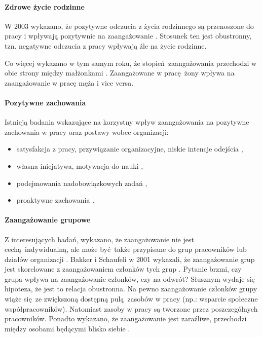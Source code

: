 \paragraph{Zdrowe życie rodzinne}
W 2003 wykazano, że pozytywne odczucia z życia rodzinnego są przenoszone do pracy i wpływają pozytywnie na zaangażowanie \citep{montgomery2003work}. Stosunek ten jest obustronny, tzn. negatywne odczucia z pracy wpływają źle na życie rodzinne. 

Co więcej wykazano w tym samym roku, że stopień zaangażowania przechodzi w obie strony między małżonkami \citep{bakker2003crossover}. Zaangażowane w pracę żony wpływa na zaangażowanie w pracę męża i vice versa.
\paragraph{Pozytywne zachowania}
Istnieją badania wskazujące na korzystny wpływ zaangażowania na pozytywne zachowania w pracy oraz postawy wobec organizacji:
\begin{itemize}
  \item satysfakcja z pracy, przywiązanie organizacyjne, niskie intencje odejścia \citep{demerouti2001job,salanova2000burnout,schaufeli2008workaholism},
  \item własna inicjatywa, motywacja do nauki \citep{sonnentag2003recovery},
  \item podejmowania nadobowiązkowych zadań \citep{salanova2005linking},
  \item proaktywne zachowania \citep{salanova2003perceived}.
\end{itemize}
\paragraph{Zaangażowanie grupowe}
Z interesujących badań, wykazano, że zaangażowanie nie jest cechą indywidualną, ale może być także przypisane do grup pracowników lub działów organizacji \citep{salanova2005linking,bakker2003multigroup}. Bakker i Schaufeli w 2001 wykazali, że zaangażowanie grup jest skorelowane z zaangażowaniem członków tych grup \citep{bakker2001burnout}. Pytanie brzmi, czy grupa wpływa na zaangażowanie członków, czy na odwrót? Słusznym wydaje się hipoteza, że jest to relacja
obustronna. Na pewno zaangażowanie członków grupy wiąże się ze zwiększoną dostępną pulą zasobów w pracy (np.: wsparcie społeczne współpracowników). Natomiast zasoby w pracy są tworzone przez poszczególnych pracowników. Ponadto wykazano, że zaangażowanie jest zaraźliwe, przechodzi między osobami będącymi blisko siebie \citep{bakker2003crossover}.

